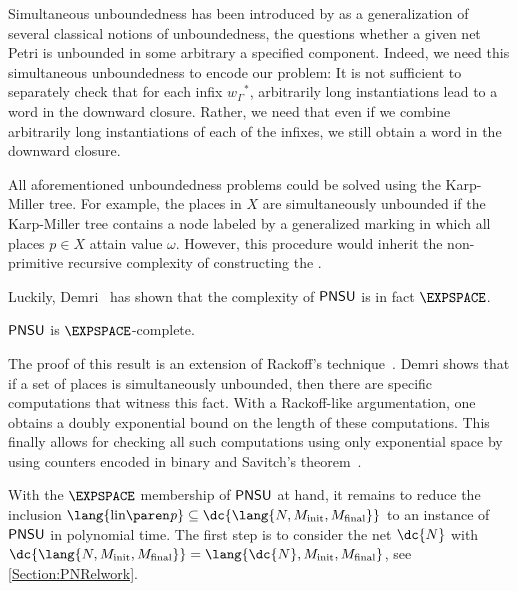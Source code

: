 \documentclass[../../diss.tex]{subfiles}
\begin{document}
\begin{problem}
    \problemshort{($\PNSU$)}
\end{problem}

Simultaneous unboundedness has been introduced by  as a generalization of several classical notions of unboundedness, \ie the questions whether a given net Petri is unbounded in some arbitrary \resp a specified component.
Indeed, we need this simultaneous unboundedness to encode our problem:
It is not sufficient to separately check that for each infix ${w_\Gamma}^*$, arbitrarily long instantiations lead to a word in the downward closure.
Rather, we need that even if we combine arbitrarily long instantiations of each of the infixes, we still obtain a word in the downward closure.

All aforementioned unboundedness problems could be solved using the Karp-Miller tree.
For example, the places in $X$ are simultaneously unbounded if the Karp-Miller tree contains a node labeled by a generalized marking in which all places $p \in X$ attain value $\omega$.
However, this procedure would inherit the non-primitive recursive complexity of constructing the .

Luckily, Demri~\cite{Demri13} has shown that the complexity of $\PNSU$ is in fact $\EXPSPACE$.

\begin{theorem}%
\label{Theorem:PNSU}%
    $\PNSU$ is $\EXPSPACE$-complete.
\end{theorem}

The proof of this result is an extension of Rackoff's technique~\cite{Rackoff78}.
Demri shows that if a set of places is simultaneously unbounded, then there are specific computations that witness this fact.
With a Rackoff-like argumentation, one obtains a doubly exponential bound on the length of these computations.
This finally allows for checking all such computations using only exponential space by using counters encoded in binary and Savitch's theorem~\cite{Savitch70}.

With the $\EXPSPACE$ membership of $\PNSU$ at hand, it remains to reduce the inclusion $\lang{\linof{\product}}\subseteq \dc{\lang{N, \Minit, \Mfinal}}$ to an instance of $\PNSU$ in polynomial time.
The first step is to consider the net $\dc{N}$ with $\dc{\lang{N, \Minit, \Mfinal}} = \lang{\dc{N}, \Minit, \Mfinal}$, see \cref{Section:PNRelwork}.
\end{document}
